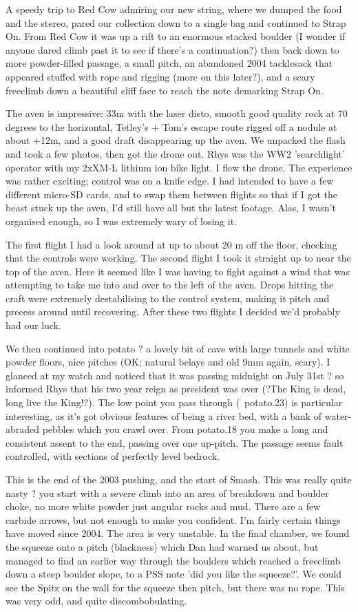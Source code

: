 A speedy trip to Red Cow admiring our new string, where we dumped the food and the stereo, pared our collection down to a single bag and continued to Strap On.
From Red Cow it was up a rift to an enormous stacked boulder (I wonder if anyone dared climb past it to see if there's a continuation?) then back down to more powder-filled passage, a small pitch, an abandoned 2004 tacklesack that appeared stuffed with rope and rigging (more on this later?), and a scary freeclimb down a beautiful cliff face to reach the note demarking Strap On.

The aven is impressive: 33m with the laser disto, smooth good quality rock at 70 degrees to the horizontal, Tetley's + Tom's escape route rigged off a nodule at about +12m, and a good draft disappearing up the aven.
We unpacked the flash and took a few photos, then got the drone out. Rhys was the WW2 'searchlight' operator with my 2xXM-L lithium ion bike light. I flew the drone.
The experience was rather exciting; control was on a knife edge. I had intended to have a few different micro-SD cards, and to swap them between flights so that if I got the beast stuck up the aven, I'd still have all but the latest footage. Alas, I wasn't organised enough, so I was extremely wary of losing it.

The first flight I had a look around at up to about 20 m off the floor, checking that the controls were working. The second flight I took it straight up to near the top of the aven. Here it seemed like I was having to fight against a wind that was attempting to take me into and over to the left of the aven. Drops hitting the craft were extremely destabilising to the control system, making it pitch and precess around until recovering. After these two flights I decided we'd probably had our luck.

We then continued into potato ? a lovely bit of cave with large tunnels and white powder floors, nice pitches (OK; natural belays and old 9mm again, scary). I glanced at my watch and noticed that it was passing midnight on July 31st ? so informed Rhys that his two year reign as president was over (?The King is dead, long live the King!?).
The low point you pass through (~potato.23) is particular interesting, as it's got obvious features of being a river bed, with a bank of water-abraded pebbles which you crawl over.
From potato.18 you make a long and consistent assent to the end, passing over one up-pitch. The passage seems fault controlled, with sections of perfectly level bedrock.


This is the end of the 2003 pushing, and the start of Smash. This was really quite nasty ? you start with a severe climb into an area of breakdown and boulder choke, no more white powder just angular rocks and mud. There are a few carbide arrows, but not enough to make you confident. I'm fairly certain things have moved since 2004. The area is very unstable. In the final chamber, we found the squeeze onto a pitch (blackness) which Dan had warned us about, but managed to find an earlier way through the boulders which reached a freeclimb down a steep boulder slope, to a PSS note 'did you like the squeeze?'. We could see the Spitz on the wall for the squeeze then pitch, but there was no rope. This was very odd, and quite discombobulating.


